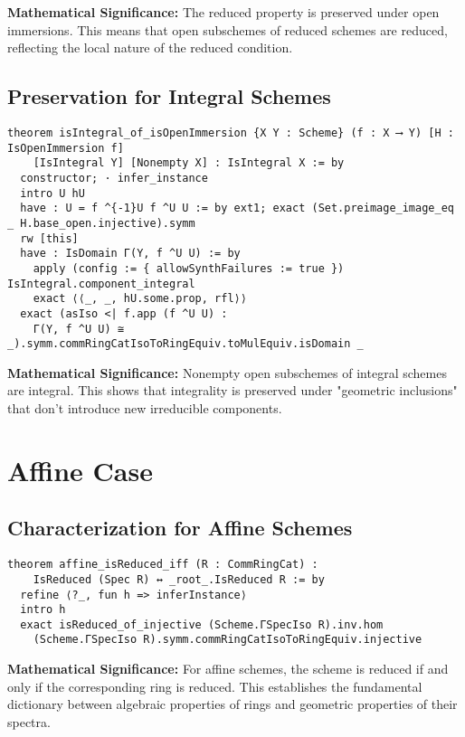 \documentclass{article}
\theoremstyle{definition}
\begin{document}
\textbf{Mathematical Significance:} The reduced property is preserved under open immersions. This means that open subschemes of reduced schemes are reduced, reflecting the local nature of the reduced condition.

\subsection{Preservation for Integral Schemes}

\begin{lstlisting}
theorem isIntegral_of_isOpenImmersion {X Y : Scheme} (f : X ⟶ Y) [H : IsOpenImmersion f]
    [IsIntegral Y] [Nonempty X] : IsIntegral X := by
  constructor; · infer_instance
  intro U hU
  have : U = f ^{-1}U f ^U U := by ext1; exact (Set.preimage_image_eq _ H.base_open.injective).symm
  rw [this]
  have : IsDomain Γ(Y, f ^U U) := by
    apply (config := { allowSynthFailures := true }) IsIntegral.component_integral
    exact ⟨⟨_, _, hU.some.prop, rfl⟩⟩
  exact (asIso <| f.app (f ^U U) :
    Γ(Y, f ^U U) ≅ _).symm.commRingCatIsoToRingEquiv.toMulEquiv.isDomain _
\end{lstlisting}

\textbf{Mathematical Significance:} Nonempty open subschemes of integral schemes are integral. This shows that integrality is preserved under "geometric inclusions" that don't introduce new irreducible components.

\section{Affine Case}

\subsection{Characterization for Affine Schemes}

\begin{lstlisting}
theorem affine_isReduced_iff (R : CommRingCat) :
    IsReduced (Spec R) ↔ _root_.IsReduced R := by
  refine ⟨?_, fun h => inferInstance⟩
  intro h
  exact isReduced_of_injective (Scheme.ΓSpecIso R).inv.hom
    (Scheme.ΓSpecIso R).symm.commRingCatIsoToRingEquiv.injective
\end{lstlisting}

\textbf{Mathematical Significance:} For affine schemes, the scheme is reduced if and only if the corresponding ring is reduced. This establishes the fundamental dictionary between algebraic properties of rings and geometric properties of their spectra.
\end{document}
